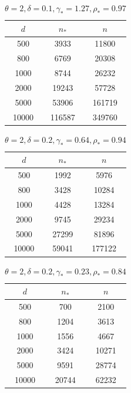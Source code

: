\documentclass[12pt]{article}
\begin{document}
\begin{table}[p]
    \centering
    \begin{tabular}{|c|c|c|}
        \hline
        $d$ & $n_*$ & $n$ \\
        \hline
        500 & 3933 & 11800\\
        800 & 6769 & 20308\\
        1000 & 8744 & 26232 \\
        2000 & 19243 & 57728 \\
        5000 & 53906 & 161719 \\
        10000 & 116587 & 349760\\
        \hline
    \end{tabular}
    \caption{$\theta=2,\delta=0.1,\gamma_*=1.27,\rho_*=0.97$}
\end{table}

\begin{table}[p]
    \centering
    \begin{tabular}{|c|c|c|}
        \hline
        $d$ & $n_*$ & $n$ \\
        \hline
        500 & 1992 & 5976\\
        800 & 3428 & 10284\\
        1000 & 4428 & 13284 \\
        2000 & 9745 & 29234 \\
        5000 & 27299 & 81896 \\
        10000 & 59041 & 177122\\
        \hline
    \end{tabular}
    \caption{$\theta=2,\delta=0.2,\gamma_*=0.64,\rho_*=0.94$}
\end{table}

\begin{table}[p]
    \centering
    \begin{tabular}{|c|c|c|}
        \hline
        $d$ & $n_*$ & $n$ \\
        \hline
        500 & 700 & 2100\\
        800 & 1204 & 3613\\
        1000 & 1556 & 4667 \\
        2000 & 3424 & 10271 \\
        5000 & 9591 & 28774 \\
        10000 & 20744 & 62232\\
        \hline
    \end{tabular}
    \caption{$\theta=2,\delta=0.2,\gamma_*=0.23,\rho_*=0.84$}
\end{table}
\end{document}
